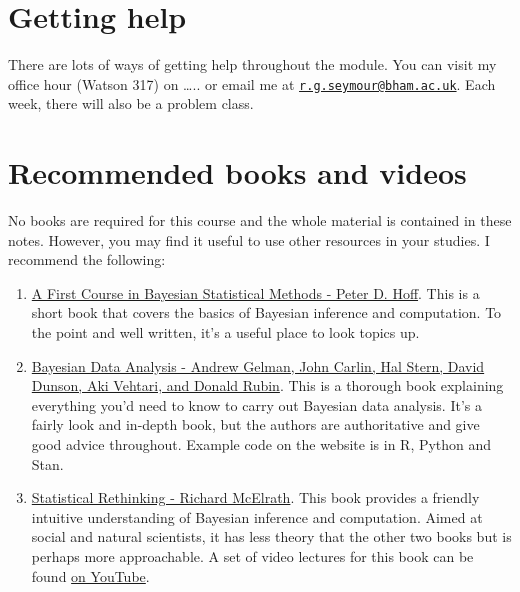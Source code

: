 \documentclass[
]{book}
\theoremstyle{definition}
\theoremstyle{definition}
\theoremstyle{definition}
\theoremstyle{definition}
\theoremstyle{remark}
\begin{document}
\hypertarget{getting-help}{%
\section{Getting help}\label{getting-help}}

There are lots of ways of getting help throughout the module. You can visit my office hour (Watson 317) on \ldots.. or email me at \href{mailto:r.g.seymour@bham.ac.uk}{\nolinkurl{r.g.seymour@bham.ac.uk}}. Each week, there will also be a problem class.

\hypertarget{recommended-books-and-videos}{%
\section{Recommended books and videos}\label{recommended-books-and-videos}}

No books are required for this course and the whole material is contained in these notes. However, you may find it useful to use other resources in your studies. I recommend the following:

\begin{enumerate}
\def\labelenumi{\arabic{enumi}.}
\item
  \href{https://link.springer.com/book/10.1007/978-0-387-92407-6}{A First Course in Bayesian Statistical Methods - Peter D. Hoff}. This is a short book that covers the basics of Bayesian inference and computation. To the point and well written, it's a useful place to look topics up.
\item
  \href{http://www.stat.columbia.edu/~gelman/book/}{Bayesian Data Analysis - Andrew Gelman, John Carlin, Hal Stern, David Dunson, Aki Vehtari, and Donald Rubin}. This is a thorough book explaining everything you'd need to know to carry out Bayesian data analysis. It's a fairly look and in-depth book, but the authors are authoritative and give good advice throughout. Example code on the website is in R, Python and Stan.
\item
  \href{https://xcelab.net/rm/statistical-rethinking/}{Statistical Rethinking - Richard McElrath}. This book provides a friendly intuitive understanding of Bayesian inference and computation. Aimed at social and natural scientists, it has less theory that the other two books but is perhaps more approachable. A set of video lectures for this book can be found \href{https://www.youtube.com/playlist?list=PLDcUM9US4XdMROZ57-OIRtIK0aOynbgZN}{on YouTube}.
\end{enumerate}
\end{document}
